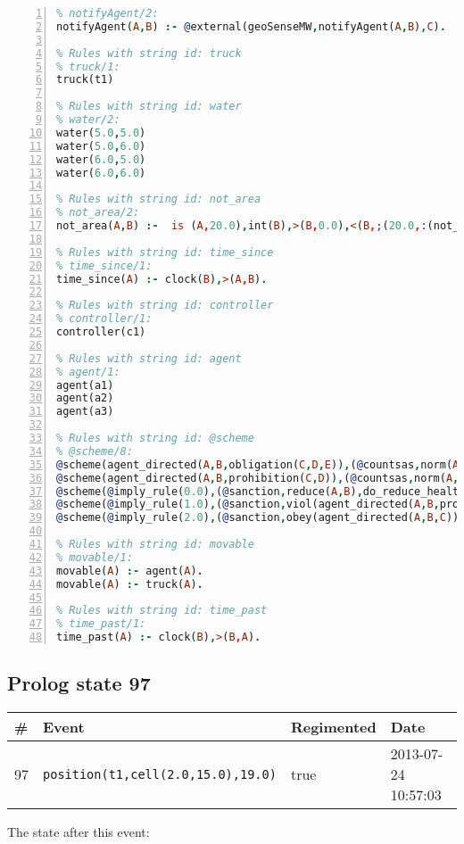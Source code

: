 \documentclass[11pt]{article}\usepackage[utf8]{inputenc}\usepackage{geometry}
\begin{document}
\begin{lstlisting}[language=Prolog, numbers=left]
% Rules with string id: notifyAgent
% notifyAgent/2:
notifyAgent(A,B) :- @external(geoSenseMW,notifyAgent(A,B),C).

% Rules with string id: truck
% truck/1:
truck(t1)

% Rules with string id: water
% water/2:
water(5.0,5.0)
water(5.0,6.0)
water(6.0,5.0)
water(6.0,6.0)

% Rules with string id: not_area
% not_area/2:
not_area(A,B) :-  is (A,20.0),int(B),>(B,0.0),<(B,;(20.0,:(not_area(A,B), is (-(B),20.0)))),int(A),>(A,0.0),<(A,;(20.0,:(area(A,B),-(int(A))))),int(B),>(A,0.0),>(B,0.0),<(A,21.0),<(B,21.0).

% Rules with string id: time_since
% time_since/1:
time_since(A) :- clock(B),>(A,B).

% Rules with string id: controller
% controller/1:
controller(c1)

% Rules with string id: agent
% agent/1:
agent(a1)
agent(a2)
agent(a3)

% Rules with string id: @scheme
% @scheme/8:
@scheme(agent_directed(A,B,obligation(C,D,E)),(@countsas,norm(A,B,F,obligation(C,D,E)),F),false,(listTrue(C)),(time_past(D)),false,[plus(viol(agent_directed(A,B,obligation(C,D,E))))|[]],[plus(obey(agent_directed(A,B,obligation(C,D,E))))|[]])
@scheme(agent_directed(A,B,prohibition(C,D)),(@countsas,norm(A,B,E,prohibition(C,D)),E),(listTrue(C)),false,(false),false,[plus(viol(agent_directed(A,B,prohibition(C,D))))|[]],[plus(obey(agent_directed(A,B,prohibition(C,D))))|[]])
@scheme(@imply_rule(0.0),(@sanction,reduce(A,B),do_reduce_health(A,B),notifyAgent(A,changed(status))),true,false,false,false,[min(reduce(A,B))|[]],[])
@scheme(@imply_rule(1.0),(@sanction,viol(agent_directed(A,B,prohibition(C,D))),do_sanction(D)),true,false,false,false,[min(viol(agent_directed(A,B,prohibition(C,D))))|[]],[])
@scheme(@imply_rule(2.0),(@sanction,obey(agent_directed(A,B,C))),true,false,false,false,[min(obey(agent_directed(A,B,C)))|[]],[])

% Rules with string id: movable
% movable/1:
movable(A) :- agent(A).
movable(A) :- truck(A).

% Rules with string id: time_past
% time_past/1:
time_past(A) :- clock(B),>(B,A).

\end{lstlisting}
\clearpage 
\subsection{Prolog state 97}
\begin{table}[ht]
\centering 
\begin{tabular}{l l l l} 
\textbf{\#} & \textbf{Event} & \textbf{Regimented} & \textbf{Date} \\ [0.5ex] 
\hline
97&\texttt{position(t1,cell(2.0,15.0),19.0)}&true&2013-07-24 10:57:03\\ [1ex] \hline\end{tabular}
\end{table}
The state after this event:
\end{document}
